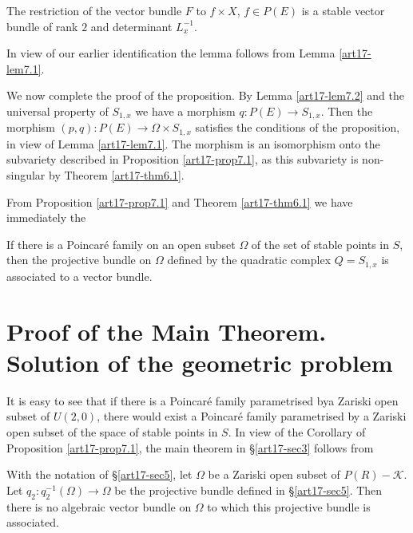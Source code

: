 \begin{lemma}\label{art17-lem7.2}
The restriction of the vector bundle $F$ to $f\times X$, $f\in P(E)$ is a stable vector bundle of rank $2$ and determinant $L^{-1}_{x}$.
\end{lemma}

In view of our earlier identification the lemma follows from Lemma \ref{art17-lem7.1}.

We now complete the proof of the proposition. By Lemma \ref{art17-lem7.2} and the universal property of $S_{1,x}$ we have a morphism $q:P(E)\to S_{1,x}$. Then the morphism $(p,q):P(E)\to \Omega\times S_{1,x}$ satisfies the conditions of the proposition, in view of Lemma \ref{art17-lem7.1}. The morphism is an isomorphism onto the subvariety described in Proposition \ref{art17-prop7.1}, as this subvariety is non-singular by Theorem \ref{art17-thm6.1}.

From Proposition \ref{art17-prop7.1} and Theorem \ref{art17-thm6.1} we have immediately the

\begin{coro*}
If there is a Poincar\'e family on an open subset $\Omega$ of the set of stable points in $S$, then the projective bundle on $\Omega$ defined by the quadratic complex $Q=S_{1,x}$ is associated to a vector bundle.
\end{coro*}

\section{Proof of the Main Theorem. Solution of the geometric problem}\label{art17-sec8}

It is easy to see that if there is a Poincar\'e family parametrised by\pageoriginale a Zariski open subset of $U(2,0)$, there would exist a Poincar\'e family parametrised by a Zariski open subset of the space of stable points in $S$. In view of the Corollary of Proposition \ref{art17-prop7.1}, the main theorem in \S\ref{art17-sec3} follows from

\begin{proposition}\label{art17-prop8.1}
With the notation of \S\ref{art17-sec5}, let $\Omega$ be a Zariski open subset of $P(R)-\mathscr{K}$. Let $q_{2}:q^{-1}_{2}(\Omega)\to \Omega$ be the projective bundle defined in \S\ref{art17-sec5}. Then there is no algebraic vector bundle on $\Omega$ to which this projective bundle is associated.
\end{proposition}

